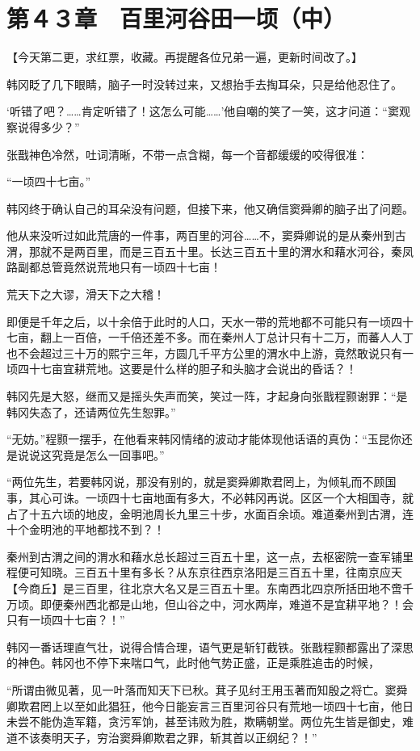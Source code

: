 \section{第４３章　百里河谷田一顷（中）}

【今天第二更，求红票，收藏。再提醒各位兄弟一遍，更新时间改了。】

韩冈眨了几下眼睛，脑子一时没转过来，又想抬手去掏耳朵，只是给他忍住了。

‘听错了吧？……肯定听错了！这怎么可能……’他自嘲的笑了一笑，这才问道：“窦观察说得多少？”

张戬神色冷然，吐词清晰，不带一点含糊，每一个音都缓缓的咬得很准：

“一顷四十七亩。”

韩冈终于确认自己的耳朵没有问题，但接下来，他又确信窦舜卿的脑子出了问题。

他从来没听过如此荒唐的一件事，两百里的河谷……不，窦舜卿说的是从秦州到古渭，那就不是两百里，而是三百五十里。长达三百五十里的渭水和藉水河谷，秦凤路副都总管竟然说荒地只有一顷四十七亩！

荒天下之大谬，滑天下之大稽！

即便是千年之后，以十余倍于此时的人口，天水一带的荒地都不可能只有一顷四十七亩，翻上一百倍，一千倍还差不多。而在秦州人丁总计只有十二万，而蕃人人丁也不会超过三十万的熙宁三年，方圆几千平方公里的渭水中上游，竟然敢说只有一顷四十七亩宜耕荒地。这要是什么样的胆子和头脑才会说出的昏话？！

韩冈先是大怒，继而又是摇头失声而笑，笑过一阵，才起身向张戬程颢谢罪：“是韩冈失态了，还请两位先生恕罪。”

“无妨。”程颢一摆手，在他看来韩冈情绪的波动才能体现他话语的真伪：“玉昆你还是说说这究竟是怎么一回事吧。”

“两位先生，若要韩冈说，那没有别的，就是窦舜卿欺君罔上，为倾轧而不顾国事，其心可诛。一顷四十七亩地面有多大，不必韩冈再说。区区一个大相国寺，就占了十五六顷的地皮，金明池周长九里三十步，水面百余顷。难道秦州到古渭，连十个金明池的平地都找不到？！

秦州到古渭之间的渭水和藉水总长超过三百五十里，这一点，去枢密院一查军铺里程便可知晓。三百五十里有多长？从东京往西京洛阳是三百五十里，往南京应天【今商丘】是三百里，往北京大名又是三百五十里。东南西北四京所括田地不啻千万顷。即便秦州西北都是山地，但山谷之中，河水两岸，难道不是宜耕平地？！会只有一顷四十七亩？！”

韩冈一番话理直气壮，说得合情合理，语气更是斩钉截铁。张戬程颢都露出了深思的神色。韩冈也不停下来喘口气，此时他气势正盛，正是乘胜追击的时候，

“所谓由微见著，见一叶落而知天下已秋。萁子见纣王用玉著而知殷之将亡。窦舜卿欺君罔上以至如此猖狂，他今日能妄言三百里河谷只有荒地一顷四十七亩，他日未尝不能伪造军籍，贪污军饷，甚至讳败为胜，欺瞒朝堂。两位先生皆是御史，难道不该奏明天子，穷治窦舜卿欺君之罪，斩其首以正纲纪？！”

